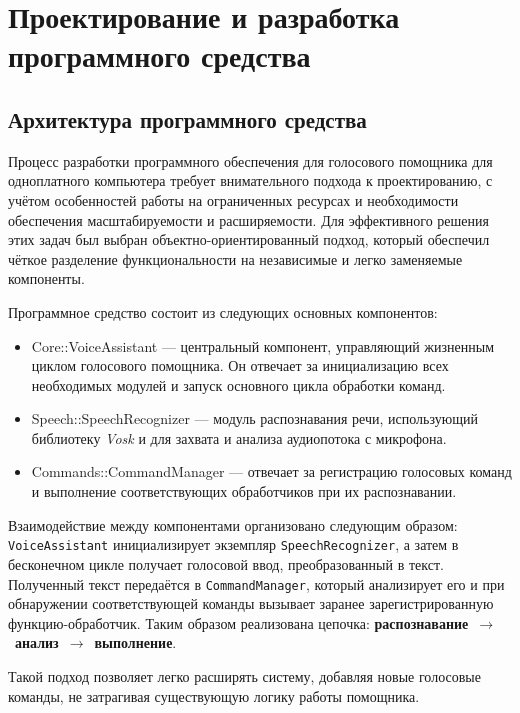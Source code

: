 \section{Проектирование и разработка программного средства}

\subsection{Архитектура программного средства}

Процесс разработки программного обеспечения для голосового помощника для одноплатного компьютера требует внимательного подхода к проектированию, с учётом особенностей работы на ограниченных ресурсах и необходимости обеспечения масштабируемости и расширяемости. Для эффективного решения этих задач был выбран объектно-ориентированный подход, который обеспечил чёткое разделение функциональности на независимые и легко заменяемые компоненты.

Программное средство состоит из следующих основных компонентов:

\begin{itemize}
	\item {Core::VoiceAssistant} — центральный компонент, управляющий жизненным циклом голосового помощника. Он отвечает за инициализацию всех необходимых модулей и запуск основного цикла обработки команд.
	
	\item {Speech::SpeechRecognizer} — модуль распознавания речи, использующий библиотеку \textit{Vosk} и  для захвата и анализа аудиопотока с микрофона.
	
	\item {Commands::CommandManager} — отвечает за регистрацию голосовых команд и выполнение соответствующих обработчиков при их распознавании.
\end{itemize}

Взаимодействие между компонентами организовано следующим образом: \texttt{VoiceAssistant} инициализирует экземпляр \texttt{SpeechRecognizer}, а затем в бесконечном цикле получает голосовой ввод, преобразованный в текст. Полученный текст передаётся в \texttt{CommandManager}, который анализирует его и при обнаружении соответствующей команды вызывает заранее зарегистрированную функцию-обработчик. Таким образом реализована цепочка: \textbf{распознавание}~$\rightarrow$~\textbf{анализ}~$\rightarrow$~\textbf{выполнение}.

Такой подход позволяет легко расширять систему, добавляя новые голосовые команды, не затрагивая существующую логику работы помощника.

